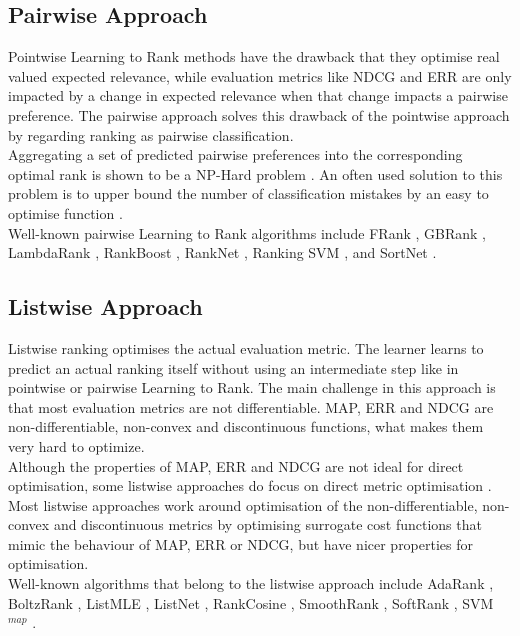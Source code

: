 \subsection{Pairwise Approach}
Pointwise Learning to Rank methods have the drawback that they optimise real valued expected relevance, while evaluation metrics like \ac{NDCG} and \ac{ERR} are only impacted by a change in expected relevance when that change impacts a pairwise preference. The pairwise approach solves this drawback of the pointwise approach by regarding ranking as pairwise classification.\\

Aggregating a set of predicted pairwise preferences into the corresponding optimal rank is shown to be a NP-Hard problem \cite{Feldman2012}. An often used solution to this problem is to upper bound the number of classification mistakes by an easy to optimise function \cite{Bartlett2006}.\\

Well-known pairwise Learning to Rank algorithms include FRank \cite{Tsai2007}, GBRank \cite{Zheng2007}, LambdaRank \cite{Burges2006}, RankBoost \cite{Freund2003}, RankNet \cite{Burges2005}, Ranking \acs{SVM} \cite{Herbrich1999b,Joachims2002}, and SortNet \cite{Rigutini2008}.
\subsection{Listwise Approach}
Listwise ranking optimises the actual evaluation metric. The learner learns to predict an actual ranking itself without using an intermediate step like in pointwise or pairwise Learning to Rank. The main challenge in this approach is that most evaluation metrics are not differentiable. \ac{MAP}, \ac{ERR} and \ac{NDCG} are non-differentiable, non-convex and discontinuous functions, what makes them very hard to optimize.\\

Although the properties of \ac{MAP}, \ac{ERR} and \ac{NDCG} are not ideal for direct optimisation, some listwise approaches do focus on direct metric optimisation \cite{Yue2007, Taylor2008, Chapelle2010}. Most listwise approaches work around optimisation of the non-differentiable, non-convex and discontinuous metrics by optimising surrogate cost functions that mimic the behaviour of \ac{MAP}, \ac{ERR} or \ac{NDCG}, but have nicer properties for optimisation.\\

Well-known algorithms that belong to the listwise approach include AdaRank \cite{Xu2007}, BoltzRank \cite{Volkovs2009}, ListMLE \cite{Xia2008}, ListNet \cite{Cao2007}, RankCosine \cite{Qin2008}, SmoothRank \cite{Chapelle2010}, SoftRank \cite{Taylor2008}, \acs{SVM}$^{map}$ \cite{Yue2007}.

